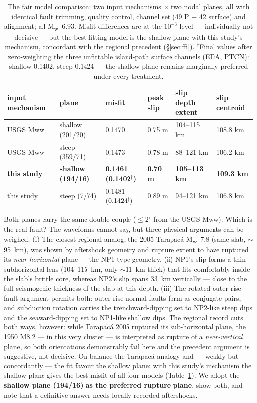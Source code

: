 \documentclass[11pt]{article}
\newcommand{\Mw}{M\textsubscript{w}}
\begin{document}
\begin{table}[H]\centering\footnotesize\setlength{\tabcolsep}{4pt}
\begin{tabular}{llllll}\toprule
input mechanism & plane & misfit & peak slip & slip depth extent & slip centroid\\\midrule
USGS Mww & shallow (201/20) & 0.1470 & 0.75 m & 104--115 km & 108.8 km\\
USGS Mww & steep (359/71) & 0.1473 & 0.78 m & 88--121 km & 106.2 km\\
\textbf{this study} & \textbf{shallow (194/16)} & \textbf{0.1461 (0.1402$^\dagger$)} & \textbf{0.70 m} & \textbf{105--113 km} & \textbf{109.3 km}\\
this study & steep (7/74) & 0.1481 (0.1424$^\dagger$) & 0.89 m & 94--121 km & 106.8 km\\\bottomrule
\end{tabular}
\caption{The fair model comparison: two input mechanisms $\times$ two nodal planes, all with
identical fault trimming, quality control, channel set (49 P + 42 surface) and alignment; all
\Mw~6.93. Misfit differences are at the $10^{-3}$ level --- individually not decisive --- but
the best-fitting model is the shallow plane with this study's mechanism, concordant with the
regional precedent (\S\ref{sec:ffi}). $^\dagger$Final values after zero-weighting the three
unfittable island-path surface channels (EDA, PTCN): shallow 0.1402, steep 0.1424 --- the
shallow plane remains marginally preferred under every treatment.}
\label{tab:planes}
\end{table}

Both planes carry the same double couple ($\leq$2$^\circ$ from the USGS Mww). Which is the
real fault? The waveforms cannot say, but three physical arguments can be weighed. (i) The
closest regional analog, the 2005 Tarapac\'a \Mw~7.8 (same slab, $\sim$95~km), was shown by
aftershock geometry and rupture extent to have ruptured its \emph{near-horizontal} plane ---
the NP1-type geometry. (ii) NP1's slip forms a thin subhorizontal lens (104--115~km, only
$\sim$11~km thick) that fits comfortably inside the slab's brittle core, whereas NP2's slip
spans 33~km vertically --- close to the full seismogenic thickness of the slab at this depth.
(iii) The rotated outer-rise-fault argument permits both: outer-rise normal faults form as
conjugate pairs, and subduction rotation carries the trenchward-dipping set to NP2-like steep
dips and the seaward-dipping set to NP1-like shallow dips. The regional record cuts both ways, however: while
Tarapac\'a 2005 ruptured its sub-horizontal plane, the 1950 M8.2 --- in this very cluster ---
is interpreted as rupture of a \emph{near-vertical} plane, so both orientations demonstrably
fail here and the precedent argument is suggestive, not decisive. On balance the Tarapac\'a
analogy and --- weakly but concordantly --- the fit favour the shallow plane:
with this study's mechanism the shallow plane gives the best misfit of all four models
(Table~\ref{tab:planes}). We adopt the \textbf{shallow plane (194/16) as the preferred
rupture plane}, show both, and note that a definitive answer needs locally recorded
aftershocks.
\end{document}
